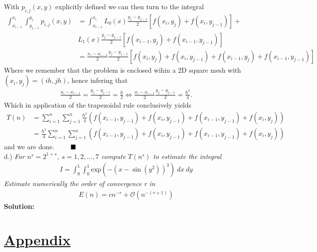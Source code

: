 \documentclass[12pt,
               a4paper,
               article,
               oneside,
               english,oldfontcommands]{memoir}
\newcommand{\Q}{ \qquad \hfill \blacksquare}
\newcommand{\spaze}{\vspace{4mm}\\}
\begin{document}
With $p_{i,j}(x,y)$ explicitly defined we can then turn to the integral 
\begin{align*}
\int_{x_{i-1}}^{x_{i}} \int_{y_{j-1}}^{y_{j}} p_{i,j}(x,y) &= \int_{x_{i-1}}^{x_{i}} L_{0}(x)  \frac{y_{j} - y_{j-1}}{2}\left[f(x_{i}, y_{j}) +  f(x_{i}, y_{j-1}) \right] + \\[5pt] 
&L_{1}(x) \frac{y_{j} - y_{j-1}}{2} \left[ f(x_{i-1}, y_{j}) + f(x_{i-1}, y_{j-1})\right] \\[10pt]
&=  \frac{x_{i} - x_{i-1}}{2} \frac{y_{j} - y_{j-1}}{2} \left[ f(x_{i}, y_{j}) +  f(x_{i}, y_{j-1})  + f(x_{i-1}, y_{j}) + f(x_{i-1}, y_{j-1})  \right]
\end{align*}
Where we remember that the problem is enclosed wihin a 2D square mesh with $(x_i, y_j) = (ih, jh)$, hence infering that 
\begin{align*}
\frac{x_{i} - x_{i-1}}{2} = \frac{y_{j} - y_{j-1}}{2} = \frac{h}{2} \iff \frac{x_{i} - x_{i-1}}{2} \frac{y_{j} - y_{j-1}}{2} = \frac{h^2}{4}.
\end{align*}
Which in application of the  trapezoidal rule conclusively yields 
\begin{align*}
T(n) &= \sum_{i=1}^{n}\sum_{j=1}^{n} \frac{h^2}{4} \left( f(x_{i-1}, y_{j-1}) + f(x_i, y_{j-1}) +  f(x_{i-1}, y_{j-1}) +  f(x_i, y_{j}) \right) \\[5pt]
&= \frac{h^2}{4}\sum_{i=1}^{n}\sum_{j=1}^{n} \left( f(x_{i-1}, y_{j-1}) + f(x_i, y_{j-1}) +  f(x_{i-1}, y_{j-1}) +  f(x_i, y_{j}) \right)
\end{align*}
and we are done. $\Q$
\spaze
d.) \emph{ For $n^s = 2^{1+s}, \ s = 1,2, \ldots, 7$ compute $T(n^s)$ to estimate the integral}
\begin{align*}
I = \int_{0}^{1} \int_{0}^{1} \text{exp}(-(x - \sin(y^2))^3) \ dx \ dy
\end{align*}
\emph{Estimate numerically the order of convergence r in}
\begin{align*}
E(n) = cn^{-r} + \mathcal{O}(n^{-(r+1)})
\end{align*}
\textbf{Solution:} \spaze
\section*{\centering \underline{Appendix}}
\end{document}

